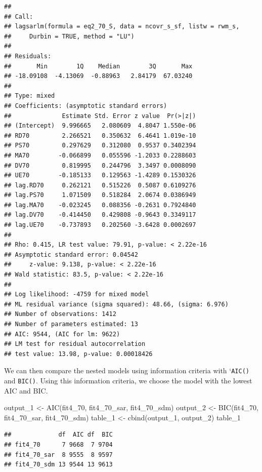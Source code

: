 \documentclass[
  krantz2]{krantz}
\makeatletter
\newenvironment{Shaded}{\begin{snugshade}}{\end{snugshade}}
\newcommand{\FunctionTok}[1]{\textcolor[rgb]{0,0,0}{#1}}
\newcommand{\NormalTok}[1]{#1}
\newcommand{\OtherTok}[1]{\textcolor[rgb]{0.37,0.37,0.37}{#1}}
\newenvironment{kframe}{%
\medskip{}
\setlength{\fboxsep}{.8em}
 \def\at@end@of@kframe{}%
 \ifinner\ifhmode%
  \def\at@end@of@kframe{\end{minipage}}%
  \begin{minipage}{\columnwidth}%
 \fi\fi%
 \def\FrameCommand##1{\hskip\@totalleftmargin \hskip-\fboxsep
 \colorbox{shadecolor}{##1}\hskip-\fboxsep
     \hskip-\linewidth \hskip-\@totalleftmargin \hskip\columnwidth}%
 \MakeFramed {\advance\hsize-\width
   \@totalleftmargin\z@ \linewidth\hsize
   \@setminipage}}%
 {\par\unskip\endMakeFramed%
 \at@end@of@kframe}
\renewenvironment{Shaded}{\begin{kframe}}{\end{kframe}}
\makeatother
\begin{document}
\begin{verbatim}
## 
## Call:
## lagsarlm(formula = eq2_70_S, data = ncovr_s_sf, listw = rwm_s, 
##     Durbin = TRUE, method = "LU")
## 
## Residuals:
##       Min        1Q    Median        3Q       Max 
## -18.09108  -4.13069  -0.88963   2.84179  67.03240 
## 
## Type: mixed 
## Coefficients: (asymptotic standard errors) 
##              Estimate Std. Error z value  Pr(>|z|)
## (Intercept)  9.996665   2.080609  4.8047 1.550e-06
## RD70         2.266521   0.350632  6.4641 1.019e-10
## PS70         0.297629   0.312080  0.9537 0.3402394
## MA70        -0.066899   0.055596 -1.2033 0.2288603
## DV70         0.819995   0.244796  3.3497 0.0008090
## UE70        -0.185133   0.129563 -1.4289 0.1530326
## lag.RD70     0.262121   0.515226  0.5087 0.6109276
## lag.PS70     1.071509   0.518284  2.0674 0.0386949
## lag.MA70    -0.023245   0.088356 -0.2631 0.7924840
## lag.DV70    -0.414450   0.429808 -0.9643 0.3349117
## lag.UE70    -0.737893   0.202560 -3.6428 0.0002697
## 
## Rho: 0.415, LR test value: 79.91, p-value: < 2.22e-16
## Asymptotic standard error: 0.04542
##     z-value: 9.138, p-value: < 2.22e-16
## Wald statistic: 83.5, p-value: < 2.22e-16
## 
## Log likelihood: -4759 for mixed model
## ML residual variance (sigma squared): 48.66, (sigma: 6.976)
## Number of observations: 1412 
## Number of parameters estimated: 13 
## AIC: 9544, (AIC for lm: 9622)
## LM test for residual autocorrelation
## test value: 13.98, p-value: 0.00018426
\end{verbatim}

We can then compare the nested models using information criteria with `\texttt{AIC()} and \texttt{BIC()}. Using this information criteria, we choose the model with the lowest AIC and BIC.

\begin{Shaded}
\begin{Highlighting}[]
\NormalTok{output\_1 }\OtherTok{\textless{}{-}} \FunctionTok{AIC}\NormalTok{(fit4\_70, fit4\_70\_sar, fit4\_70\_sdm)}
\NormalTok{output\_2 }\OtherTok{\textless{}{-}} \FunctionTok{BIC}\NormalTok{(fit4\_70, fit4\_70\_sar, fit4\_70\_sdm)}
\NormalTok{table\_1 }\OtherTok{\textless{}{-}} \FunctionTok{cbind}\NormalTok{(output\_1, output\_2)}
\NormalTok{table\_1}
\end{Highlighting}
\end{Shaded}

\begin{verbatim}
##             df  AIC df  BIC
## fit4_70      7 9668  7 9704
## fit4_70_sar  8 9555  8 9597
## fit4_70_sdm 13 9544 13 9613
\end{verbatim}
\end{document}

